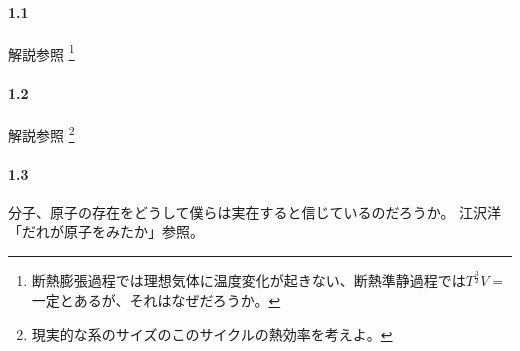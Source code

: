 \paragraph{1.1}
解説参照
\footnote{
  断熱膨張過程では理想気体に温度変化が起きない、断熱準静過程では$T^{\frac{3}{2}}V=$一定とあるが、それはなぜだろうか。
}

\paragraph{1.2}
解説参照
\footnote{
  現実的な系のサイズのこのサイクルの熱効率を考えよ。
}

\paragraph{1.3}
分子、原子の存在をどうして僕らは実在すると信じているのだろうか。
江沢洋「だれが原子をみたか」参照。